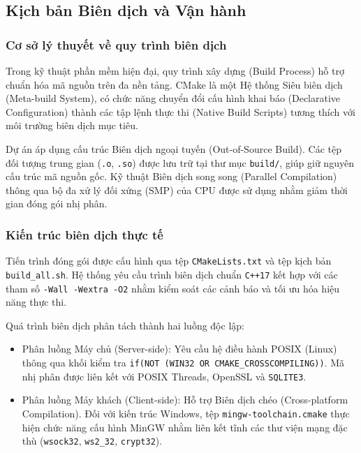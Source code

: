 \subsection{Kịch bản Biên dịch và Vận hành}

\subsubsection{Cơ sở lý thuyết về quy trình biên dịch}

Trong kỹ thuật phần mềm hiện đại, quy trình xây dựng (Build Process) hỗ trợ chuẩn hóa mã nguồn trên đa nền tảng. CMake là một Hệ thống Siêu biên dịch (Meta-build System), có chức năng chuyển đổi cấu hình khai báo (Declarative Configuration) thành các tập lệnh thực thi (Native Build Scripts) tương thích với môi trường biên dịch mục tiêu.

Dự án áp dụng cấu trúc Biên dịch ngoại tuyến (Out-of-Source Build). Các tệp đối tượng trung gian (\texttt{.o}, \texttt{.so}) được lưu trữ tại thư mục \texttt{build/}, giúp giữ nguyên cấu trúc mã nguồn gốc. Kỹ thuật Biên dịch song song (Parallel Compilation) thông qua bộ đa xử lý đối xứng (SMP) của CPU được sử dụng nhằm giảm thời gian đóng gói nhị phân.

\subsubsection{Kiến trúc biên dịch thực tế}

Tiến trình đóng gói được cấu hình qua tệp \texttt{CMakeLists.txt} và tệp kịch bản \texttt{build\_all.sh}. Hệ thống yêu cầu trình biên dịch chuẩn \texttt{C++17} kết hợp với các tham số \texttt{-Wall -Wextra -O2} nhằm kiểm soát các cảnh báo và tối ưu hóa hiệu năng thực thi.

Quá trình biên dịch phân tách thành hai luồng độc lập:
\begin{itemize}[label={-}]
    \item Phân luồng Máy chủ (Server-side): Yêu cầu hệ điều hành POSIX (Linux) thông qua khối kiểm tra \texttt{if(NOT (WIN32 OR CMAKE\_CROSSCOMPILING))}. Mã nhị phân được liên kết với POSIX Threads, OpenSSL và \texttt{SQLITE3}.
    \item Phân luồng Máy khách (Client-side): Hỗ trợ Biên dịch chéo (Cross-platform Compilation). Đối với kiến trúc Windows, tệp \texttt{mingw-toolchain.cmake} thực hiện chức năng cấu hình MinGW nhằm liên kết tĩnh các thư viện mạng đặc thù (\texttt{wsock32}, \texttt{ws2\_32}, \texttt{crypt32}).
\end{itemize}

